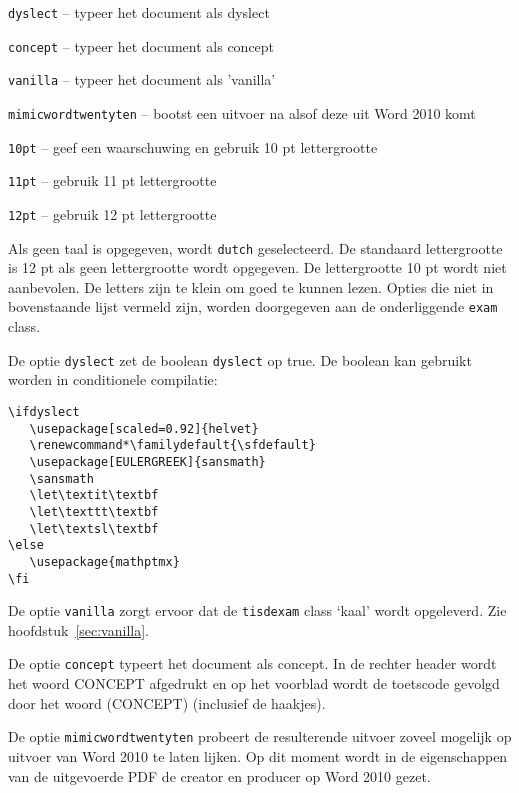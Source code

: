 \documentclass[dutch,a4paper,12pt,addpoints,fleqn,oneside]{tisdexam}
\newcommand\DocClass[1]{\texttt{#1}}
\newcommand\Option[1]{\texttt{#1}}
\begin{document}
\Option{dyslect} -- typeer het document als dyslect

\Option{concept} -- typeer het document als concept

\Option{vanilla} -- typeer het document als 'vanilla'

\Option{mimicwordtwentyten} -- bootst een uitvoer na alsof deze uit Word 2010 komt

\Option{10pt} -- geef een waarschuwing en gebruik 10 pt lettergrootte%

\Option{11pt} -- gebruik 11 pt lettergrootte

\Option{12pt} -- gebruik 12 pt lettergrootte

\bigskip
Als geen taal is opgegeven, wordt \Option{dutch} geselecteerd.
De standaard lettergrootte is 12 pt als geen lettergrootte wordt opgegeven.
De lettergrootte 10 pt wordt niet aanbevolen. De letters zijn te klein om
goed te kunnen lezen.
Opties die niet in bovenstaande lijst vermeld zijn, worden doorgegeven aan
de onderliggende \DocClass{exam} class.

\medskip
De optie \Option{dyslect} zet de boolean \Option{dyslect} op true. De boolean
kan gebruikt worden in conditionele compilatie:

\begin{lstlisting}
\ifdyslect
   \usepackage[scaled=0.92]{helvet}
   \renewcommand*\familydefault{\sfdefault}
   \usepackage[EULERGREEK]{sansmath}
   \sansmath
   \let\textit\textbf
   \let\texttt\textbf
   \let\textsl\textbf
\else
   \usepackage{mathptmx}
\fi
\end{lstlisting}


\medskip
De optie \Option{vanilla} zorgt ervoor dat de \DocClass{tisdexam} class `kaal'
wordt opgeleverd. Zie hoofdstuk~\ref{sec:vanilla}.

\medskip
De optie \Option{concept} typeert het document als concept. In de rechter header
wordt het woord CONCEPT afgedrukt en op het voorblad wordt de toetscode
gevolgd door het woord (CONCEPT) (inclusief de haakjes).

\medskip
De optie \Option{mimicwordtwentyten} probeert de resulterende uitvoer zoveel
mogelijk op uitvoer van Word 2010 te laten lijken. Op dit moment wordt in de
eigenschappen van de uitgevoerde PDF de creator en producer op Word 2010 gezet.
\end{document}
